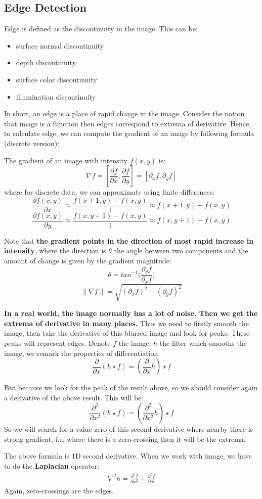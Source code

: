 \subsection{Edge Detection}
Edge is defined as the discontinuity in the image. This can be:
\begin{itemize}
	\item surface normal discontinuity
	\item depth discontinuity
	\item surface color discontinuity
	\item illumination discontinuity
\end{itemize}
In short, an edge is a place of rapid change in the image. Consider the notion that image is a function then edges correspond to extrema of derivative. Hence, to calculate edge, we can compute the gradient of an image by following formula (discrete version):
\begin{defi}
	The gradient of an image with intensity $f(x, y)$ is:
\[ \nabla f = [\frac{\partial f}{\partial x}, \frac{\partial f}{\partial y}] = [ \partial_x f, \partial_y f ] \]
where for discrete data, we can approximate using finite differences:
\[ \frac{\partial f(x, y)}{\partial x} \approx \frac{f(x+1, y) - f(x, y)}{1} \approx f(x+1,y) - f(x,y)\]
\[ \frac{\partial f(x, y)}{\partial y} \approx \frac{f(x, y+1) - f(x, y)}{1} \approx f(x,y+1) - f(x,y)\]
\end{defi}

Note that \textbf{the gradient points in the direction of most rapid increase in intensity}, where the direction is $\theta$ the angle between two components and the amount of change is given by the gradient magnitude:
\[  \theta = tan^{-1} \Big( \frac{\partial_y f}{\partial_x f}  \Big)  \]
\[  \| \nabla f  \| = \sqrt{(\partial_x f)^2 + (\partial_y f)^2}  \]

\textbf{In a real world, the image normally has a lot of noise. Then we get the extrema of derivative in many places.} Thus we need to firstly smooth the image, then take the derivative of this blurred image and look for peaks. These peaks will represent edges. Denote $f$ the image, $h$ the filter which smooths the image, we remark the properties of differentiation:
\[ 
\frac{\partial}{\partial x} (h \star f) = (\frac{\partial}{\partial x} h) \star f
\]

But because we look for the peak of the result above, so we should consider again a derivative of the above result. This will be:
\[ 
\frac{\partial^2}{\partial x^2}(h \star f) = (\frac{\partial^2}{\partial x^2}h) \star f
\]
So we will search for a value zero of this second derivative where nearby there is strong gradient, i.e. where there is a zero-crossing then it will be the extrema. 

The above formula is 1D second derivative. When we work with image, we have to do the \textbf{Laplacian} operator:
\begin{align}
\nabla^2 h = \frac{\partial^2 f}{\partial x^2} + \frac{\partial^2 f}{\partial y^2}
\end{align}
Again, zero-crossings are the edges.
